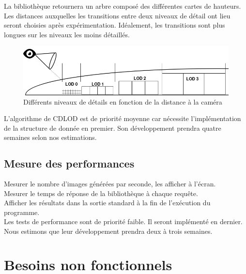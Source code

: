 \documentclass[12pt]{report}
\begin{document}
La bibliothèque retournera un arbre composé des différentes cartes de
hauteurs.\\

Les distances auxquelles les transitions entre deux niveaux de détail
ont lieu seront choisies après expérimentation. Idéalement, les
transitions sont plus longues sur les niveaux les moins détaillés.

\begin{center}
\begin{figure}[!h]
  \includegraphics[scale=0.5]{img/lods.png}
  \caption{Différents niveaux de détails en fonction de la distance à la
  caméra}
  \label{fig:lods}
\end{figure}
\end{center}

L'algorithme de CDLOD est de priorité moyenne car nécessite
l'implémentation de la structure de donnée en premier. Son
développement prendra quatre semaines selon nos estimations.\\

\subsection{Mesure des performances}

Mesurer le nombre d'images générées par seconde, les afficher à
l'écran.\\
Mesurer le temps de réponse de la bibliothèque à chaque requête.\\
Afficher les résultats dans la sortie standard à la fin de l'exécution
du programme.\\

Les tests de performance sont de priorité faible. Il seront implémenté
en dernier. Nous estimons que leur développement prendra deux à trois
semaines.\\


\newpage
\section{Besoins non fonctionnels}
\end{document}
